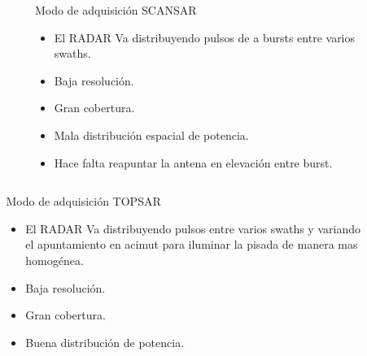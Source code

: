 \begin{frame}{} \vskip0cm
  \begin{columns}
    \begin{column}{0.5\textwidth}
       \begin{figure}
         \centering
         \label{}
       \end{figure}
    \end{column}
    \begin{column}{0.5\textwidth}  %
      \begin{block}{Modo de adquisición SCANSAR}
        \begin{itemize}
          \item El RADAR Va distribuyendo pulsos de a bursts entre varios swaths.
          \item Baja resolución.
          \item Gran cobertura.
          \item Mala distribución espacial de potencia.
          \item Hace falta reapuntar la antena en elevación entre burst.
        \end{itemize}
      \end{block}
    \end{column}
    \end{columns}
\end{frame}
\begin{frame}{} \vskip0cm
  \begin{columns}
    \begin{column}{0.5\textwidth}
       \begin{figure}
         \centering
         \label{}
       \end{figure}
    \end{column}
    \begin{column}{0.5\textwidth}  %
      \begin{block}{Modo de adquisición TOPSAR}
        \begin{itemize}
          \item El RADAR Va distribuyendo pulsos entre varios swaths y variando el apuntamiento en acimut para iluminar la pisada de manera mas homogénea.
          \item Baja resolución.
          \item Gran cobertura.
          \item Buena distribución de potencia.
        \end{itemize}
      \end{block}
    \end{column}
    \end{columns}
\end{frame}


